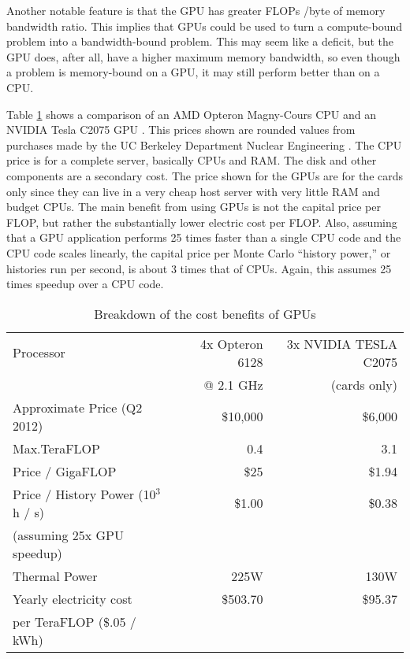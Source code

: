 Another notable feature is that the GPU has greater FLOPs /byte of memory bandwidth ratio.  This implies that GPUs could be used to turn a compute-bound problem into a bandwidth-bound problem.  This may seem like a deficit, but the GPU does, after all, have a higher maximum memory bandwidth, so even though a problem is memory-bound on a GPU, it may still perform better than on a CPU.

Table \ref{gpu_money} shows a comparison of an AMD Opteron Magny-Cours CPU and an NVIDIA Tesla C2075 GPU \cite{cpu_latency,cuda}.  This prices shown are rounded values from purchases made by the UC Berkeley Department Nuclear Engineering \cite{cost_sheets}.  The CPU price is for a complete server, basically CPUs and RAM.  The disk and  other components are a secondary cost.  The price shown for the GPUs are for the cards only since they can live in a very cheap host server with very little RAM and budget CPUs.  The main benefit from using GPUs is not the capital price per FLOP, but rather the substantially lower electric cost per FLOP.  Also, assuming that a GPU application performs 25 times faster than a single CPU code and the CPU code scales linearly, the capital price per Monte Carlo ``history power,'' or histories run per second, is about 3 times that of CPUs.  Again, this assumes 25 times speedup over a CPU code.  

\begin{table}[h]
\centering
\caption{Breakdown of the cost benefits of GPUs \cite{cost_sheets,c2075,opterondate}}
\label{gpu_money}
\begin{tabular}{| l | r | r |}
\hline
Processor & 4x Opteron 6128  & 3x NVIDIA TESLA C2075 \\
  & @ 2.1 GHz &  (cards only)  \\
\hline
\hline
Approximate Price (Q2 2012)& \$10,000 & \$6,000 \\
\hline
Max.TeraFLOP & 0.4 & 3.1 \\
\hline
Price / GigaFLOP & \$25 & \$1.94 \\
\hline
Price / History Power (10$^3$ h / s) & \$1.00 & \$0.38 \\
(assuming 25x GPU speedup) & & \\
\hline
Thermal Power & 225W & 130W \\
\hline
Yearly electricity cost & \$503.70  & \$95.37 \\
per TeraFLOP (\$.05 / kWh)   & & \\
\hline
\end{tabular}
\end{table}

